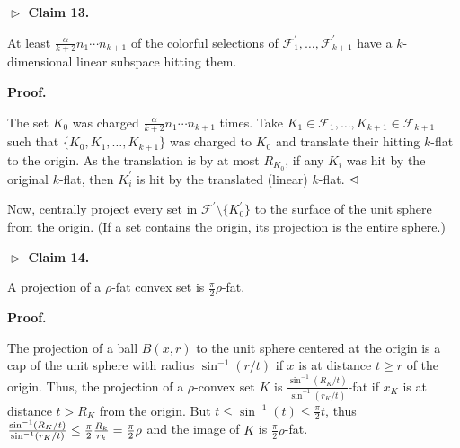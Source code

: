 \documentclass[10pt,a4paper]{amsart}
\begin{document}
\par
\par
\par\medskip\noindent\textbf{$\vartriangleright$ Claim 13.}\par
At least $\frac{\alpha}{k+2}n_{1}\cdots n_{k+1}$ of the colorful selections of $\mathcal{F}_{1}^{\prime},\ldots,\mathcal{F}_{k+1}^{\prime}$ have a $k$-dimensional linear subspace hitting them.
\par
\par
\par
\par
\par\medskip\noindent\textbf{Proof.}\par
The set $K_{0}$ was charged $\frac{\alpha}{k+2}n_{1}\cdots n_{k+1}$ times. Take $K_{1}\in\mathcal{F}_{1},\ldots,K_{k+1}\in\mathcal{F}_{k+1}$ such that $\{K_{0},K_{1},\ldots,K_{k+1}\}$ was charged to $K_{0}$ and translate their hitting $k$-flat to the origin. As the translation is by at most $R_{K_{0}}$, if any $K_{i}$ was hit by the original $k$-flat, then $K_{i}^{\prime}$ is hit by the translated (linear) $k$-flat. $\hfill\vartriangleleft$
\par
\par
Now, centrally project every set in $\mathcal{F}^{\prime}\setminus\{K_{0}^{\prime}\}$ to the surface of the unit sphere from the origin. (If a set contains the origin, its projection is the entire sphere.)
\par
\par
\par\medskip\noindent\textbf{$\vartriangleright$ Claim 14.}\par
A projection of a $\rho$-fat convex set is $\frac{\pi}{2}\rho$-fat.
\par
\par
\par
\par
\par\medskip\noindent\textbf{Proof.}\par
The projection of a ball $B(x,r)$ to the unit sphere centered at the origin is a cap of the unit sphere with radius $\sin^{-1}(r/t)$ if $x$ is at distance $t\geq r$ of the origin. Thus, the projection of a $\rho$-convex set $K$ is $\frac{\sin^{-1}(R_{K}/t)}{\sin^{-1}(r_{K}/t)}$-fat if $x_{K}$ is at distance $t>R_{K}$ from the origin. But $t\leq\sin^{-1}(t)\leq\frac{\pi}{2}t$, thus $\frac{\sin^{-1}(R_{K}/t)}{\sin^{-1}(r_{K}/t)}\leq\frac{\pi}{2}\frac{R_{k}}{r_{%
k}}=\frac{\pi}{2}\rho$ and the image of $K$ is $\frac{\pi}{2}\rho$-fat.
\end{document}
